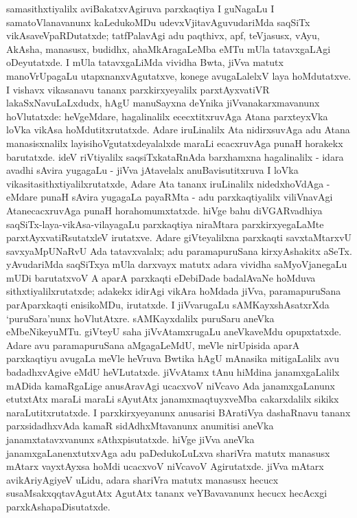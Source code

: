 samasithxtiyalilx aviBakatxvAgiruva parxkaqtiya I guNagaLu I samatoVlanavanunx kaLedukoMDu udevxVjitavAguvudariMda saqSiTx vikAsaveVpaRDutatxde; tatfPalavAgi adu paqthivx, apf, teVjasusx, vAyu, AkAsha, manasusx, budidhx, ahaMkAragaLeMba eMTu mUla tatavxgaLAgi oDeyutatxde. I mUla tatavxgaLiMda vividha Bwta, jiVva matutx manoVrUpagaLu utapxnanxvAgutatxve, konege avugaLalelxV laya hoMdutatxve. I vishavx vikasanavu tananx parxkirxyeyalilx parxtAyxvatiVR lakaSxNavuLaLxdudx, hAgU manuSayxna deYnika jiVvanakarxmavanunx hoVlutatxde: heVgeMdare, hagalinalilx ececxtitxruvAga Atana parxteyxVka loVka vikAsa hoMdutitxrutatxde. Adare iruLinalilx Ata nidirxsuvAga adu Atana manasisxnalilx layisihoVgutatxdeyalalxde maraLi ecacxruvAga punaH horakekx barutatxde. ideV riVtiyalilx saqsiTxkataRnAda barxhamxna hagalinalilx - idara avadhi sAvira yugagaLu - jiVva jAtavelalx anuBavisutitxruva I loVka vikasitasithxtiyalilxrutatxde, Adare Ata tananx iruLinalilx nidedxhoVdAga - eMdare punaH sAvira yugagaLa payaRMta - adu parxkaqtiyalilx viliVnavAgi AtanecacxruvAga punaH horahomumxtatxde. hiVge bahu diVGARvadhiya saqSiTx-laya-vikAsa-vilayagaLu parxkaqtiya niraMtara parxkirxyegaLaMte parxtAyxvatiRsutatxleV irutatxve. Adare giVteyalilxna parxkaqti savxtaMtarxvU savxyaMpUNaRvU Ada tatavxvalalx; adu paramapuruSana kirxyAshakitx aSeTx. yAvudariMda saqSiTxya mUla darxvayx matutx adara vividha saMyoVjanegaLu mUDi barutatxvoV A aparA parxkaqti eDebiDade badalAvaNe hoMduva sithxtiyalilxrutatxde; adakekx idirAgi vikAra hoMdada jiVva, paramapuruSana parAparxkaqti enisikoMDu, irutatxde. I jiVvarugaLu sAMKayxshAsatxrXda `puruSara'nunx hoVlutAtxre. sAMKayxdalilx puruSaru aneVka eMbeNikeyuMTu. giVteyU saha jiVvAtamxrugaLu aneVkaveMdu opupxtatxde. Adare avu paramapuruSana aMgagaLeMdU, meVle nirUpisida aparA parxkaqtiyu avugaLa meVle heVruva Bwtika hAgU mAnasika mitigaLalilx avu badadhxvAgive eMdU heVLutatxde. jiVvAtamx tAnu hiMdina janamxgaLalilx mADida kamaRgaLige anusAravAgi ucacxvoV niVcavo Ada janamxgaLanunx etutxtAtx maraLi maraLi sAyutAtx janamxmaqtuyxveMba cakarxdalilx sikikx naraLutitxrutatxde. I parxkirxyeyanunx anusarisi BAratiVya dashaRnavu tananx parxsidadhxvAda kamaR sidAdhxMtavanunx anumitisi aneVka janamxtatavxvanunx sAthxpisutatxde. hiVge jiVva aneVka janamxgaLanenxtutxvAga adu paDedukoLuLxva shariVra matutx manasusx mAtarx vayxtAyxsa hoMdi ucacxvoV niVcavoV Agirutatxde. jiVva mAtarx avikAriyAgiyeV uLidu, adara shariVra matutx manasusx hecucx susaMsakxqqtavAgutAtx AgutAtx tananx veYBavavanunx hecucx hecAcxgi parxkAshapaDisutatxde.

